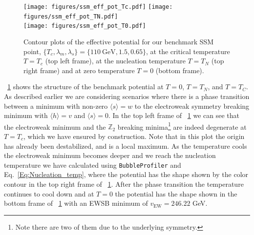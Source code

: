 \documentclass[final,3p,11pt,pdflatex]{elsarticle}
\makeatletter
\newcommand{\bp}{\texttt{BubbleProfiler}\@\xspace}
\newcommand{\figref}[1]{\figurename~\ref{#1}}
\renewcommand{\refeq}[1]{Eq.~\ref{#1}}
\makeatother
\begin{document}
\begin{figure}[h!]
\centering
    \texttt{[image: figures/ssm\_eff\_pot\_Tc.pdf]}
    \texttt{[image: figures/ssm\_eff\_pot\_TN.pdf]}
  \\
    \texttt{[image: figures/ssm\_eff\_pot\_T0.pdf]}
\caption{Contour plots of the effective potential for our benchmark SSM point, $\{T_c, \lambda_m, \lambda_s\} = \{110\ \textrm{GeV},1.5,0.65\}$, at the critical temperature $T = T_c$ (top left frame), at the nucleation temperature $T = T_N$ (top right frame) and at zero temperature $T = 0$ (bottom frame).}
\label{fig:sm_plus_singlet_contours}
\end{figure}



\figref{fig:sm_plus_singlet_contours} shows the structure of the
benchmark potential at $T = 0$, $T = T_N$, and $T = T_C$.  As
described earlier we are considering scenarios where there is a phase
transition between a minimum with non-zero $\langle s \rangle = w$ to
the electroweak symmetry breaking minimum with $\langle h \rangle = v$
and $\langle s \rangle = 0$.  In the top left frame of
\figref{fig:sm_plus_singlet_contours} we can see that the electroweak
minimum and the $\mathbb{Z}_2$ breaking minima\footnote{Note there are
  two of them due to the underlying symmetry.} are indeed degenerate at $T=T_c$,
which we have ensured by construction. Note that in this plot the
origin has already been destabilized, and is a local maximum.  As the
temperature cools the electroweak minimum becomes deeper and we reach
the nucleation temperature we have calculated using \bp and
\refeq{Eq:Nucleation_temp}, where the potential has the shape shown by
the color contour in the top right frame of
\figref{fig:sm_plus_singlet_contours}.  After the phase transition the
temperature continues to cool down and at $T=0$ the potential has the
shape shown in the bottom frame of \figref{fig:sm_plus_singlet_contours}
with an EWSB minimum of $v_\text{EW} = 246.22$ GeV.
\end{document}
